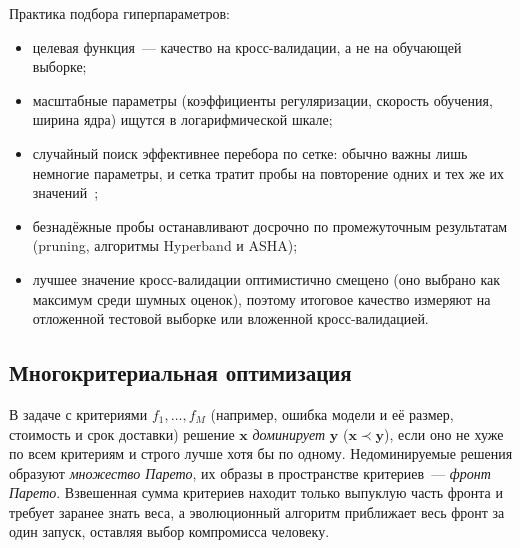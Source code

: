 Практика подбора гиперпараметров:
\begin{itemize}
\item целевая функция~--- качество на кросс-валидации, а не на обучающей выборке;
\item масштабные параметры (коэффициенты регуляризации, скорость обучения, ширина ядра) ищутся в
логарифмической шкале;
\item случайный поиск эффективнее перебора по сетке: обычно важны лишь немногие параметры, и сетка тратит
пробы на повторение одних и тех же их значений~\cite{bergstra2012};
\item безнадёжные пробы останавливают досрочно по промежуточным результатам (pruning, алгоритмы Hyperband
и ASHA);
\item лучшее значение кросс-валидации оптимистично смещено (оно выбрано как максимум среди шумных оценок),
поэтому итоговое качество измеряют на отложенной тестовой выборке или вложенной кросс-валидацией.
\end{itemize}

\subsection{Многокритериальная оптимизация}
\label{sec:moo}

В задаче с критериями $f_1, \ldots, f_M$ (например, ошибка модели и её размер, стоимость и срок
доставки) решение $\mathbf{x}$ \emph{доминирует} $\mathbf{y}$ ($\mathbf{x} \prec \mathbf{y}$), если оно
не хуже по всем критериям и строго лучше хотя бы по одному. Недоминируемые решения образуют
\emph{множество Парето}, их образы в пространстве критериев~--- \emph{фронт Парето}. Взвешенная сумма
критериев находит только выпуклую часть фронта и требует заранее знать веса, а эволюционный алгоритм
приближает весь фронт за один запуск, оставляя выбор компромисса человеку.


